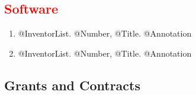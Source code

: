 \documentclass[10pt]{article}
\renewcommand{\new}[1]{\textcolor{red}{#1}}
\renewcommand{\iowa}[1]{#1}
\renewcommand{\iowa}[1]{}
\begin{document}
\subsection*{\new{Software}}
\smallskip

\begin{enumerate} \setlength{\itemsep}{0ex}
 \item @InventorList. @Number, @Title. @Annotation
 \item @InventorList. @Number, @Title. @Annotation
\end{enumerate}

\iowa{
\subsection*{Areas of Research Interest}
\smallskip

\begin{itemize} \setlength{\itemsep}{0ex}
 \item [] @Area
 \item [] @Area
 \item [] @Area
\end{itemize}
}

\subsection*{Grants and Contracts}
\smallskip
\end{document}
